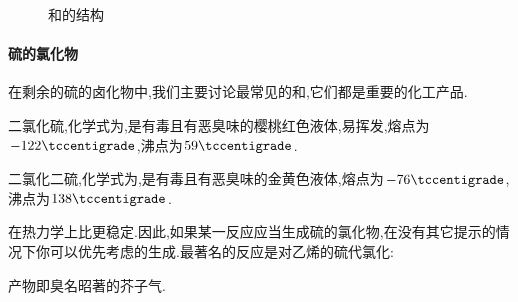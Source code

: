 \documentclass{ctexart}
\begin{document}
\begin{enumerate}[label=\tbf{\arabic*},topsep=0pt,parsep=0pt,itemsep=0pt,partopsep=0pt]
\begin{figure}[H]
{\begin{minipage}[b]{.45\linewidth}
                \end{minipage}
            }
            \caption{和的结构}
        \end{figure}
\end{enumerate}
\paragraph{硫的氯化物}
在剩余的硫的卤化物中,我们主要讨论最常见的和,它们都是重要的化工产品.
\begin{substance}[\ce{SCl2}]
    二氯化硫,化学式为,是有毒且有恶臭味的樱桃红色液体,易挥发,熔点为$-122\tccentigrade$,沸点为$59\tccentigrade$.
\end{substance}
\begin{substance}[\ce{S2Cl2}]
    二氯化二硫,化学式为,是有毒且有恶臭味的金黄色液体,熔点为$-76\tccentigrade$,沸点为$138\tccentigrade$.
\end{substance}
在热力学上比更稳定.因此,如果某一反应应当生成硫的氯化物,在没有其它提示的情况下你可以优先考虑的生成.最著名的反应是对乙烯的硫代氯化:
\begin{center}
\end{center}
产物即臭名昭著的芥子气.
\end{document}
